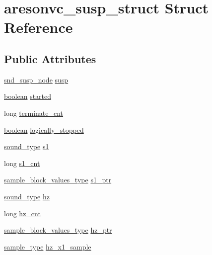 \hypertarget{structaresonvc__susp__struct}{}\section{aresonvc\+\_\+susp\+\_\+struct Struct Reference}
\label{structaresonvc__susp__struct}
\subsection*{Public Attributes}
\begin{DoxyCompactItemize}
\item 
\hyperlink{sound_8h_a6b268203688a934bd798ceb55f85d4c0}{snd\+\_\+susp\+\_\+node} \hyperlink{structaresonvc__susp__struct_a282541319b89240c8748242a720241b3}{susp}
\item 
\hyperlink{cext_8h_a7670a4e8a07d9ebb00411948b0bbf86d}{boolean} \hyperlink{structaresonvc__susp__struct_a66efb2263395106250e2ee958f770e8a}{started}
\item 
long \hyperlink{structaresonvc__susp__struct_a6deb3ff59f3fdacbc719376f91c01528}{terminate\+\_\+cnt}
\item 
\hyperlink{cext_8h_a7670a4e8a07d9ebb00411948b0bbf86d}{boolean} \hyperlink{structaresonvc__susp__struct_a4a4afc88e49cb4754768ebaa2479784b}{logically\+\_\+stopped}
\item 
\hyperlink{sound_8h_a792cec4ed9d6d636d342d9365ba265ea}{sound\+\_\+type} \hyperlink{structaresonvc__susp__struct_adec9cc289bfdce7e8efe2b78f1411906}{s1}
\item 
long \hyperlink{structaresonvc__susp__struct_abf0592198bd024df41540d9b1adb6fcb}{s1\+\_\+cnt}
\item 
\hyperlink{sound_8h_a83d17f7b465d1591f27cd28fc5eb8a03}{sample\+\_\+block\+\_\+values\+\_\+type} \hyperlink{structaresonvc__susp__struct_a5cacf63c484bcb1fde6e7ce5de2a80b4}{s1\+\_\+ptr}
\item 
\hyperlink{sound_8h_a792cec4ed9d6d636d342d9365ba265ea}{sound\+\_\+type} \hyperlink{structaresonvc__susp__struct_ae9fc1e8652690d35706436ff8b778111}{hz}
\item 
long \hyperlink{structaresonvc__susp__struct_a9a3dfd6c2b22892c97b9a11fd98bad13}{hz\+\_\+cnt}
\item 
\hyperlink{sound_8h_a83d17f7b465d1591f27cd28fc5eb8a03}{sample\+\_\+block\+\_\+values\+\_\+type} \hyperlink{structaresonvc__susp__struct_a1d82efd8065f61bd54a0326d2c5e9417}{hz\+\_\+ptr}
\item 
\hyperlink{sound_8h_a3a9d1d4a1c153390d2401a6e9f71b32c}{sample\+\_\+type} \hyperlink{structaresonvc__susp__struct_af5fc3651600dd5179967dcb9167e4f59}{hz\+\_\+x1\+\_\+sample}

\end{DoxyCompactItemize}
